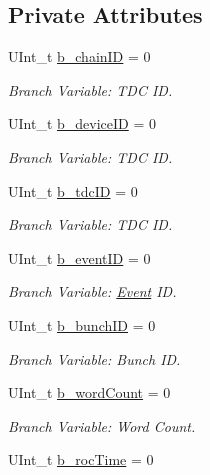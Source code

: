 \subsection*{Private Attributes}
\begin{DoxyCompactItemize}
\item 
U\+Int\+\_\+t \hyperlink{class_packet_tree_manager_adc5ce7f7482c38f9d5241dd213d777ec}{b\+\_\+chain\+ID} = 0
\begin{DoxyCompactList}\small\item\em Branch Variable\+: T\+DC ID. \end{DoxyCompactList}\item 
U\+Int\+\_\+t \hyperlink{class_packet_tree_manager_a3b24072d6fecb5f36a2f23a9e442f74b}{b\+\_\+device\+ID} = 0
\begin{DoxyCompactList}\small\item\em Branch Variable\+: T\+DC ID. \end{DoxyCompactList}\item 
U\+Int\+\_\+t \hyperlink{class_packet_tree_manager_a5a07d44397bd25e8fc1e9db65f472d1a}{b\+\_\+tdc\+ID} = 0
\begin{DoxyCompactList}\small\item\em Branch Variable\+: T\+DC ID. \end{DoxyCompactList}\item 
U\+Int\+\_\+t \hyperlink{class_packet_tree_manager_a854d865fd2916a85e22560fee8a5c592}{b\+\_\+event\+ID} = 0
\begin{DoxyCompactList}\small\item\em Branch Variable\+: \hyperlink{class_event}{Event} ID. \end{DoxyCompactList}\item 
U\+Int\+\_\+t \hyperlink{class_packet_tree_manager_a3f7da74c8d3e4f3323c7ffdb8b845c45}{b\+\_\+bunch\+ID} = 0
\begin{DoxyCompactList}\small\item\em Branch Variable\+: Bunch ID. \end{DoxyCompactList}\item 
U\+Int\+\_\+t \hyperlink{class_packet_tree_manager_ad7d8e0343e3e5f949dc20e591b2e6b2b}{b\+\_\+word\+Count} = 0
\begin{DoxyCompactList}\small\item\em Branch Variable\+: Word Count. \end{DoxyCompactList}\item 
U\+Int\+\_\+t \hyperlink{class_packet_tree_manager_a710e3e4d48e842b512720774ab05e83a}{b\+\_\+roc\+Time} = 0

\end{DoxyCompactItemize}
